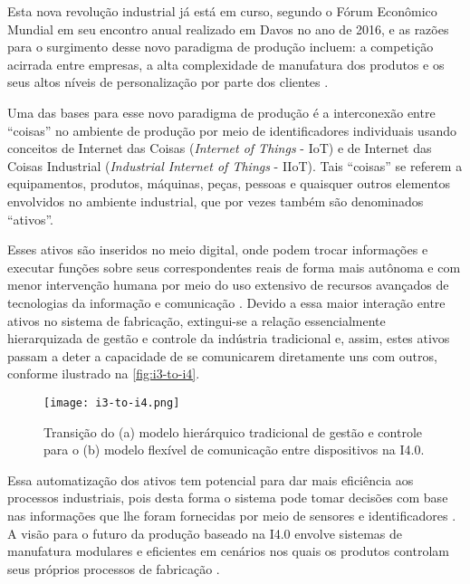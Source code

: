 Esta nova revolução industrial já está em curso, segundo o Fórum Econômico Mundial \cite{schwab2016fourth} em seu encontro anual realizado em Davos no ano de 2016, e as razões para o surgimento desse novo paradigma de produção incluem: a competição acirrada entre empresas, a alta complexidade de manufatura dos produtos e os seus altos níveis de personalização por parte dos clientes \cite{bordeleau2018bi, vaidya2018industryfour}.

Uma das bases para esse novo paradigma de produção é a interconexão entre ``coisas'' no ambiente de produção por meio de identificadores individuais usando conceitos de Internet das Coisas (\textit{Internet of Things} - IoT) e de Internet das Coisas Industrial (\textit{Industrial Internet of Things} - IIoT). Tais ``coisas'' se referem a equipamentos, produtos, máquinas, peças, pessoas e quaisquer outros elementos envolvidos no ambiente industrial, que por vezes também são denominados ``ativos''.

Esses ativos são inseridos no meio digital, onde podem trocar informações e executar funções sobre seus correspondentes reais de forma mais autônoma e com menor intervenção humana por meio do uso extensivo de recursos avançados de tecnologias da informação e comunicação \cite{adolph2018roadmap}. Devido a essa maior interação entre ativos no sistema de fabricação, extingui-se a relação essencialmente hierarquizada de gestão e controle da indústria tradicional e, assim, estes ativos passam a deter a capacidade de se comunicarem diretamente uns com outros, conforme ilustrado na \autoref{fig:i3-to-i4}.

\begin{figure}[htb]
	\centering
	\texttt{[image: i3-to-i4.png]}
	\caption{Transição do (a) modelo hierárquico tradicional de gestão e controle para o (b) modelo flexível de comunicação entre dispositivos na I4.0.}
	\label{fig:i3-to-i4}
\end{figure}

Essa automatização dos ativos tem potencial para dar mais eficiência aos processos industriais, pois desta forma o sistema pode tomar decisões com base nas informações que lhe foram fornecidas por meio de sensores e identificadores \cite{schmittner2017mtom}. A visão para o futuro da produção baseado na I4.0 envolve sistemas de manufatura modulares e eficientes em cenários nos quais os produtos controlam seus próprios processos de fabricação \cite{lasi2014industryfour}.

